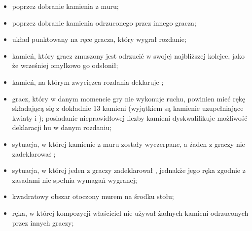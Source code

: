 \begin{itemize}
\item {}
\hu  poprzez dobranie kamienia z muru;
\item {}
\hu  poprzez dobranie kamienia odrzuconego przez innego gracza;
\item {}
układ punktowany na ręce gracza, który wygrał rozdanie;
\item {}
kamień, który gracz zmuszony jest odrzucić w swojej najbliższej kolejce, jako że
wcześniej omyłkowo go odsłonił;
\item {}
kamień, na którym zwycięzca rozdania deklaruje \hu; 
\item {}
gracz, który w danym momencie gry nie wykonuje ruchu, powinien mieć rękę
składającą się z dokładnie 13 kamieni (wyjątkiem są kamienie uzupełniające
kwiaty i ); posiadanie nieprawidłowej liczby kamieni
dyskwalifikuje możliwość deklaracji hu w danym rozdaniu;
\item {}
sytuacja, w której kamienie z muru zostały wyczerpane, a żaden z graczy nie
zadeklarował \huend;
\item {}
sytuacja, w której jeden z graczy zadeklarował \huend, jednakże jego ręka
zgodnie z zasadami nie spełnia wymagań wygranej;
\item {}
kwadratowy obszar otoczony murem na środku stołu;
\item {}
ręka, w której kompozycji właściciel nie używał żadnych kamieni odrzuconych
przez innych graczy;
\end{itemize}

